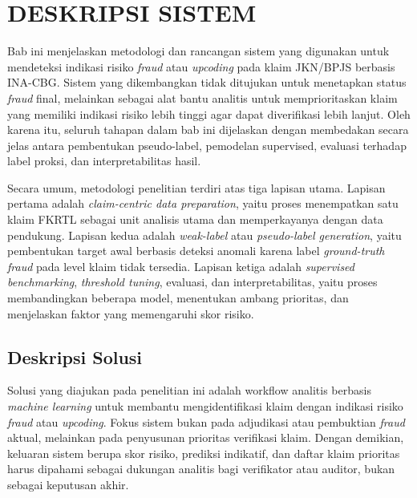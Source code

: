 \chapter{DESKRIPSI SISTEM}

Bab ini menjelaskan metodologi dan rancangan sistem yang digunakan untuk mendeteksi indikasi risiko \emph{fraud} atau \emph{upcoding} pada klaim JKN/BPJS berbasis INA-CBG. Sistem yang dikembangkan tidak ditujukan untuk menetapkan status \emph{fraud} final, melainkan sebagai alat bantu analitis untuk memprioritaskan klaim yang memiliki indikasi risiko lebih tinggi agar dapat diverifikasi lebih lanjut. Oleh karena itu, seluruh tahapan dalam bab ini dijelaskan dengan membedakan secara jelas antara pembentukan pseudo-label, pemodelan supervised, evaluasi terhadap label proksi, dan interpretabilitas hasil.

Secara umum, metodologi penelitian terdiri atas tiga lapisan utama. Lapisan pertama adalah \emph{claim-centric data preparation}, yaitu proses menempatkan satu klaim FKRTL sebagai unit analisis utama dan memperkayanya dengan data pendukung. Lapisan kedua adalah \emph{weak-label} atau \emph{pseudo-label generation}, yaitu pembentukan target awal berbasis deteksi anomali karena label \emph{ground-truth fraud} pada level klaim tidak tersedia. Lapisan ketiga adalah \emph{supervised benchmarking}, \emph{threshold tuning}, evaluasi, dan interpretabilitas, yaitu proses membandingkan beberapa model, menentukan ambang prioritas, dan menjelaskan faktor yang memengaruhi skor risiko.

\section{Deskripsi Solusi}\label{deskripsi-solusi}

Solusi yang diajukan pada penelitian ini adalah workflow analitis berbasis \emph{machine learning} untuk membantu mengidentifikasi klaim dengan indikasi risiko \emph{fraud} atau \emph{upcoding}. Fokus sistem bukan pada adjudikasi atau pembuktian \emph{fraud} aktual, melainkan pada penyusunan prioritas verifikasi klaim. Dengan demikian, keluaran sistem berupa skor risiko, prediksi indikatif, dan daftar klaim prioritas harus dipahami sebagai dukungan analitis bagi verifikator atau auditor, bukan sebagai keputusan akhir.


